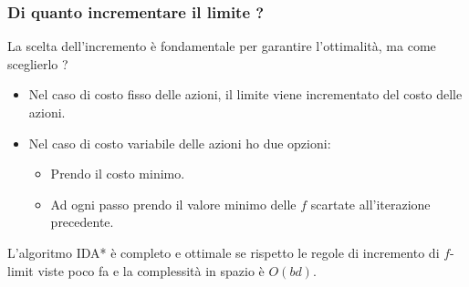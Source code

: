 \subsubsection{Di quanto incrementare il limite ?}
La scelta dell'incremento \`e fondamentale per garantire l'ottimalit\`a, ma come
sceglierlo ?
\begin{itemize}
	\item Nel caso di costo fisso delle azioni, il limite viene incrementato del costo
	      delle azioni.
	\item Nel caso di costo variabile delle azioni ho due opzioni:
	      \begin{itemize}
		      \item Prendo il costo minimo.
		      \item Ad ogni passo prendo il valore minimo delle $f$ scartate
		            all'iterazione precedente.
	      \end{itemize}
\end{itemize}
L'algoritmo IDA* \`e completo e ottimale se rispetto le regole di incremento di $f$-limit 
viste poco fa e la complessit\`a in spazio \`e $O(bd)$.